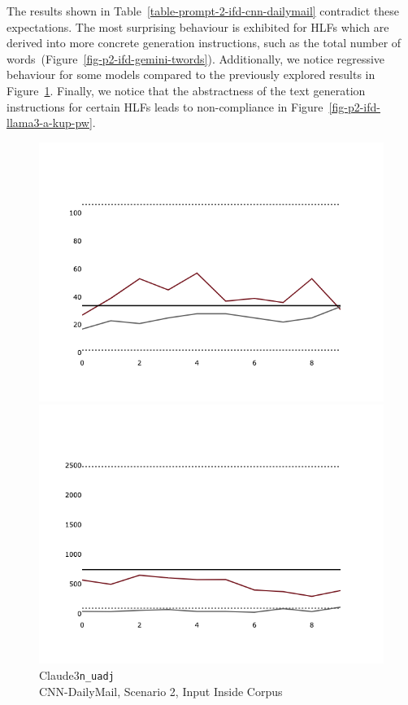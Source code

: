 \documentclass[a4paper,twoside]{article}
\begin{document}
The results shown in Table~\ref{table-prompt-2-ifd-cnn-dailymail} contradict
these expectations.
The most surprising behaviour is exhibited for HLFs which are derived into more
concrete generation instructions, such as the total number of
words~(Figure~\ref{fig-p2-ifd-gemini-twords}).
Additionally, we notice regressive behaviour for some models compared to the
previously explored results in Figure~\ref{fig-p2-ifd-claude3-nuadj}.
Finally, we notice that the abstractness of the text generation instructions for
certain HLFs leads to non-compliance in Figure~\ref{fig-p2-ifd-llama3-a-kup-pw}.

\begin{figure}[ht!]
    \centering
    \begin{minipage}{0.32\textwidth}
        \includegraphics[width=\linewidth]{plots/prompt_2_ifd/prompt_2-claude3-cnn_dailymail/prompt_2-claude3-cnn_dailymail_n_uadj.png}
        \caption{Claude3\texttt{n\_uadj}\\CNN-DailyMail, Scenario 2, Input Inside Corpus}\label{fig-p2-ifd-claude3-nuadj}
    \end{minipage}
    \hfill
    \begin{minipage}{0.32\textwidth}
        \includegraphics[width=\linewidth]{plots/prompt_2_ifd/prompt_2-gemini-cnn_dailymail/prompt_2-gemini-cnn_dailymail_t_word.png}

\end{minipage}
\end{figure}
\end{document}
